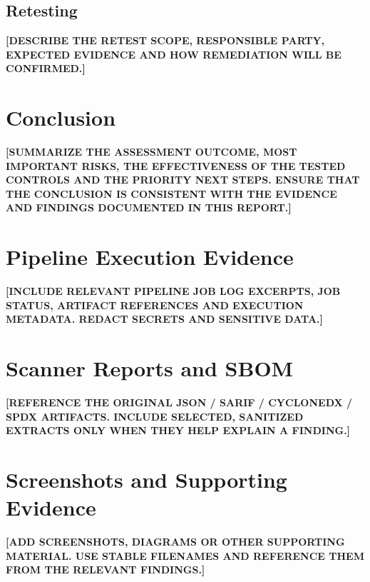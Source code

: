 \documentclass[11pt,a4paper]{report}
\newcommand{\placeholder}[1]{\textbf{[#1]}}
\begin{document}
\section{Retesting}
\placeholder{DESCRIBE THE RETEST SCOPE, RESPONSIBLE PARTY, EXPECTED EVIDENCE
AND HOW REMEDIATION WILL BE CONFIRMED.}

\chapter{Conclusion}

\placeholder{SUMMARIZE THE ASSESSMENT OUTCOME, MOST IMPORTANT RISKS,
THE EFFECTIVENESS OF THE TESTED CONTROLS AND THE PRIORITY NEXT STEPS.
ENSURE THAT THE CONCLUSION IS CONSISTENT WITH THE EVIDENCE AND FINDINGS
DOCUMENTED IN THIS REPORT.}

\appendix

\chapter{Pipeline Execution Evidence}
\placeholder{INCLUDE RELEVANT PIPELINE JOB LOG EXCERPTS, JOB STATUS,
ARTIFACT REFERENCES AND EXECUTION METADATA. REDACT SECRETS AND SENSITIVE DATA.}

\chapter{Scanner Reports and SBOM}
\placeholder{REFERENCE THE ORIGINAL JSON / SARIF / CYCLONEDX / SPDX
ARTIFACTS. INCLUDE SELECTED, SANITIZED EXTRACTS ONLY WHEN THEY HELP
EXPLAIN A FINDING.}

\chapter{Screenshots and Supporting Evidence}
\placeholder{ADD SCREENSHOTS, DIAGRAMS OR OTHER SUPPORTING MATERIAL.
USE STABLE FILENAMES AND REFERENCE THEM FROM THE RELEVANT FINDINGS.}
\end{document}
